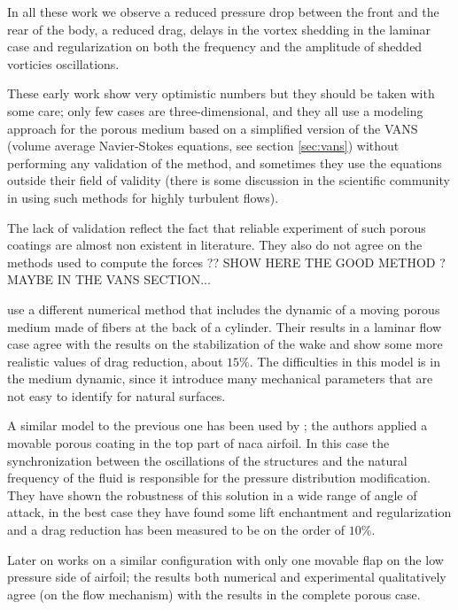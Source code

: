 In all these work we observe a reduced pressure drop between the front and the rear of the body, a reduced drag, delays in the vortex shedding in the laminar case and regularization on both the frequency and the amplitude of shedded vorticies oscillations.

These early work show very optimistic numbers but they should be taken with some care; only few cases are three-dimensional, and they all use a modeling approach for the porous medium based on a simplified version of the VANS (volume average Navier-Stokes equations, see section \ref{sec:vans}) without performing any validation of the method, and sometimes they use the equations outside their field of validity (there is some discussion in the scientific community in using such methods for highly turbulent flows).

The lack of validation reflect the fact that reliable experiment of such porous coatings are almost non existent in literature.
They also do not agree on the methods used to compute the forces \citet{caltagirone1994interaction}?? SHOW HERE THE GOOD METHOD ? MAYBE IN THE VANS SECTION...


\citet{favier2009passive} use a different numerical method that includes the dynamic of a moving porous medium made of fibers at the back of a cylinder.
Their results in a laminar flow case agree with the results on the stabilization of the wake and show some more realistic values of drag reduction, about $15\%$.
The difficulties in this model is in the medium dynamic, since it introduce many mechanical parameters that are not easy to identify for natural surfaces.

A similar model to the previous one has been used by \citet{venkataraman2012numerical}; the authors applied a movable porous coating in the top part of naca airfoil.
In this case the synchronization between the oscillations of the structures and the natural frequency of the fluid is responsible for the pressure distribution modification.
They have shown the robustness of this solution in a wide range of angle of attack, in the best case they have found some lift enchantment and regularization and a drag reduction has been measured to be on the order of $10\%$.

Later on \citet{rosti2017pelskin} works on a similar configuration with only one movable flap on the low pressure side of airfoil; the results both numerical and experimental qualitatively agree (on the flow mechanism) with the results in the complete porous case.


